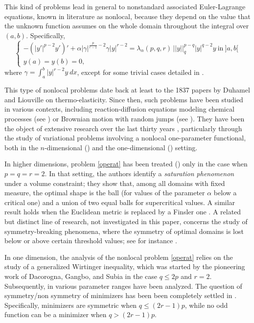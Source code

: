 \documentclass{amsart}
\theoremstyle{definition}
\theoremstyle{remark}
\begin{document}
This kind of problems lead in general to nonstandard associated Euler-Lagrange equations, known in literature as nonlocal, because they depend on the value that the unknown function assumes on the whole domain throughout the integral over $(a,b)$. Specifically,
\begin{equation*}%
\left\{
\begin{array}{ll}
-(|y'|^{p-2}y')' + \alpha |\gamma|^{\frac p {r-1}-2}\gamma |y|^{r-2}=\lambda_\alpha(p,q,r)\, ||y||_q^{p-q}|y|^{q-2}y
\ \text{in}\ ]a,b[\\[.3cm]
y(a)=y(b)=0,
\end{array}
\right.
\end{equation*}
where $\gamma=\int_{a}^b |y|^{r-2}y\  dx$, except for some trivial cases detailed in .

This type of nonlocal problems date back at least to the 1837 papers by Duhamel \cite{Du} and Liouville \cite{Lio} on thermo-elasticity. Since then, such problems have been studied in various contexts, including reaction-diffusion equations modeling chemical processes (see \cite{F,S}) or Brownian motion with random jumps (see \cite{P}). They have been the object of extensive research over the last thirty years \cite{F1, F, FV}, particularly through the study of variational problems involving a nonlocal one-parameter functional, both in the $n$-dimensional (\cite{BFNT}) and the one-dimensional (\cite{DP,DP2}) setting. 

In higher dimensions, problem \eqref{operat} has been treated (\cite{BFNT%
}) only in the case when $p=q=r=2$. In that setting, the authors identify a {\it saturation phenomenon} under a volume constraint; they show that, among all domains with fixed measure, the optimal shape is the ball (for values of the parameter $\alpha$ below a critical one) and a union of two equal balls for supercritical values. A similar result holds when the Euclidean metric is replaced by a Finsler one \cite{Pi}. A related but distinct line of research, not investigated in this paper, concerns the study of symmetry-breaking phenomena, where the symmetry of optimal domains is lost below or above certain threshold values; see for instance \cite{BDNT,BCGM,Narxiv}.

In one dimension, the analysis of the nonlocal problem \eqref{operat} relies on the study of a generalized Wirtinger inequality, which was started by the pioneering work of Dacorogna, Gangbo, and Subia \cite{DGS} in the case $q\leq 2p$ and $r=2$. Subsequently,  in \cite{E,BKN,BK, N1, CD, GN} various parameter ranges have been analyzed. The question of symmetry/non symmetry of minimizers has been been completely settled in \cite{GGR}. Specifically, minimizers are symmetric when $q\leq (2r-1)p$, while no odd function can be a minimizer when $q>(2r-1)p$.
\end{document}

